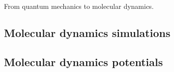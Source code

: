 From quantum mechanics to molecular dynamics.

\subsection{Molecular dynamics simulations}

\subsection{Molecular dynamics potentials}
